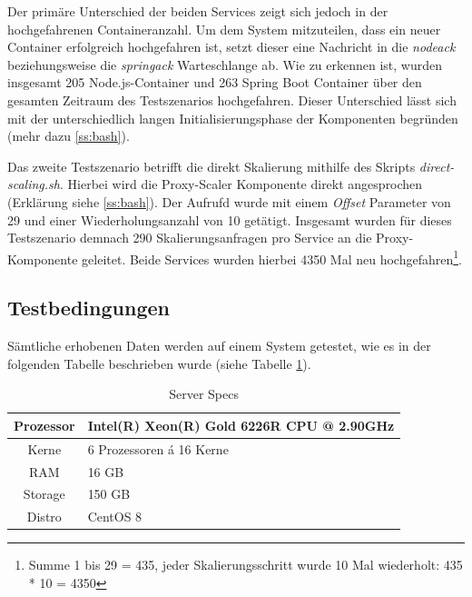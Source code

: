 Der primäre Unterschied der beiden Services zeigt sich jedoch in der hochgefahrenen Containeranzahl. Um dem System mitzuteilen, dass ein neuer Container erfolgreich hochgefahren ist, setzt dieser eine Nachricht in die \emph{nodeack} beziehungsweise die \emph{springack} Warteschlange ab. Wie zu erkennen ist, wurden insgesamt 205 Node.js-Container und 263 Spring Boot Container über den gesamten Zeitraum des Testszenarios hochgefahren. Dieser Unterschied lässt sich mit der unterschiedlich langen Initialisierungsphase der Komponenten begründen (mehr dazu \ref{ss:bash}).

Das zweite Testszenario betrifft die direkt Skalierung mithilfe des Skripts \emph{direct-scaling.sh}. Hierbei wird die Proxy-Scaler Komponente direkt angesprochen (Erklärung siehe \ref{ss:bash}). Der Aufrufd wurde mit einem \emph{Offset} Parameter von 29 und einer Wiederholungsanzahl von 10 getätigt. Insgesamt wurden für dieses Testszenario demnach 290 Skalierungsanfragen pro Service an die Proxy-Komponente geleitet. Beide Services wurden hierbei 4350 Mal neu hochgefahren\footnote{Summe 1 bis 29 = 435, jeder Skalierungsschritt wurde 10 Mal wiederholt: 435 * 10 = 4350}.

\subsection{Testbedingungen \checkmark}

Sämtliche erhobenen Daten werden auf einem System getestet, wie es in der folgenden Tabelle beschrieben wurde (siehe Tabelle \ref{tab:serverSpecs}). 

\renewcommand\theadalign{bc}
\renewcommand\theadfont{\bfseries}
\renewcommand\theadgape{\Gape[4pt]}
\renewcommand\cellgape{\Gape[4pt]}

\begin{table}[ht!]
  \centering
  \caption{Server Specs}
  \label{tab:serverSpecs}
  \bigskip
  \begin{tabular}{ c l }
    \toprule
    Prozessor & Intel(R) Xeon(R) Gold 6226R CPU @ 2.90GHz \\
    \midrule
    Kerne & 6 Prozessoren á 16 Kerne \\
    \midrule
    RAM & 16 GB \\
    \midrule
    Storage & 150 GB \\
    \midrule
    Distro & CentOS 8\\
    \bottomrule
  \end{tabular}
\end{table}
